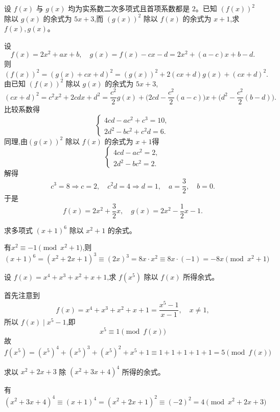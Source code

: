 \begin{questions}
    \question 设 $f(x)$ 与 $g(x)$ 均为实系数二次多项式且首项系数都是 $2$。已知 $(f(x))^2$ 除以 $g(x)$ 的余式为 $5x+3$,而 $(g(x))^2$ 除以 $f(x)$ 的余式为 $x+1$,求 $f(x),g(x)$。
    \begin{solution}
        设
        \[
        f(x) = 2x^2 + a x + b, \quad g(x) = f(x) - c x - d = 2x^2 + (a-c)x + b-d.
        \]
        则
        \[
        (f(x))^2 = (g(x) + c x + d)^2 = (g(x))^2 + 2(c x + d) g(x) + (c x + d)^2.
        \]
        由已知 $(f(x))^2$ 除以 $g(x)$ 的余式为 $5x+3$,
        \[
        (c x + d)^2 = c^2 x^2 + 2 c d x + d^2 = \frac{c^2}{2} g(x) + \Big(2 c d - \frac{c^2}{2}(a-c)\Big)x + \Big(d^2 - \frac{c^2}{2}(b-d)\Big).
        \]
        比较系数得
        \[
        \begin{cases}
        4 c d - a c^2 + c^3 = 10,\\
        2 d^2 - b c^2 + c^2 d = 6.
        \end{cases}
        \]
        同理,由$(g(x))^2$ 除以 $f(x)$ 的余式为 $x+1$得
        \[
        \begin{cases}
        4 c d - a c^2 = 2,\\
        2 d^2 - b c^2 = 2.
        \end{cases}
        \]
        解得
        \[
        c^3 = 8 \Rightarrow c = 2, \quad c^2 d = 4 \Rightarrow d = 1, \quad a = \frac{3}{2}, \quad b = 0.
        \]
        于是
        \[
        f(x) = 2 x^2 + \frac{3}{2}x, \quad g(x) = 2 x^2 - \frac{1}{2}x - 1.
        \]
    \end{solution}

    \question 求多项式 $(x + 1)^6$ 除以 $x^2 + 1$ 的余式。
    \begin{solution}
        有$x^2 \equiv -1 \pmod{x^2+1}$,则
        $$(x+1)^6 = (x^2 + 2x + 1)^3 \equiv (2x)^3
        = 8x \cdot x^2 \equiv 8x \cdot (-1)
        = -8x \pmod{x^2+1}$$
    \end{solution}  
    
    \question 设 $f(x) = x^4 + x^3 + x^2 + x + 1$,求 $f(x^5)$ 除以 $f(x)$ 所得余式。 
    \begin{solution}
        首先注意到
        \[
        f(x) = x^4 + x^3 + x^2 + x + 1 = \frac{x^5 - 1}{x - 1}, \quad x \ne 1,
        \]
        所以 \( f(x) \mid x^5 - 1 \),即
        \[
        x^5 \equiv 1 \pmod{f(x)}
        \]
        故
        \[
        f(x^5) = (x^5)^4 + (x^5)^3 + (x^5)^2 + x^5 + 1 \equiv 1 + 1 + 1 + 1 + 1 = 5 \pmod{f(x)}
        \]
    \end{solution}

    \question 求以 $x^2 + 2x + 3$ 除 $(x^2 + 3x + 4)^4$ 所得的余式。
    \begin{solution}
    有
        \[
        (x^2 + 3x + 4)^4 \equiv (x+1)^4 = (x^2+2x+1)^2 \equiv (-2)^2 = 4 \pmod{x^2 + 2x + 3}
        \]
    \end{solution}


\end{questions}

